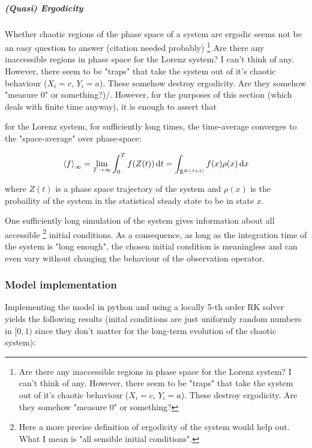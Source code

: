 \documentclass[11pt]{article}
\newcommand{\R}{{\mathbb{R}}}
\begin{document}
\subparagraph{(Quasi) Ergodicity}
\label{sec:org5576994}

Whether chaotic regions of the phase space of a system are ergodic seems not be an easy question
to answer (citation needed probably) \footnote{Are there any inaccessible regions in phase space
for the Lorenz system? I can't think of any. However, there seem to be "traps" that take the
system out of it's chaotic behaviour (\(X_i = c\), \(Y_i=a\)). These destroy ergodicity.
Are they somehow "measure 0" or something?} Are there any inaccessible regions in phase space
for the Lorenz system? I can't think of any. However, there seem to be "traps" that take the
system out of it's chaotic behaviour (\(X_i = c\), \(Y_i=a\)). These somehow destroy ergodicity.
Are they somehow "measure 0" or something?)/. However, for the purposes of this section (which deals with
finite time anyway), it is enough to assert that

for the Lorenz system, for sufficiently long times, the time-average converges to the
"space-average" over phase-space:

\begin{equation}
\label{eqn:lorenz_ergodicity}
   \expval{f}_{\infty} = \lim_{T \to \infty} \int_0^T f(Z(t)) \dd{t} = \int_{\R^{K(J+1)}} f(x) \rho(x) \dd{x}
\end{equation}

where \(Z(t)\) is a phase space trajectory of the system and \(\rho(x)\) is the probaility of the
system in the statistical steady state to be in state \(x\).

One sufficiently long simulation of the system gives information about all accessible \footnote{Here a more precise definition of ergodicity of the system would help out. What I mean
is "all sensible initial conditions".} initial conditions.
As a consequence, as long as the integration time of the system is "long enough", the chosen initial
condition is meaningless and can even vary without changing the behaviour of the observation operator.

\subsubsection{Model implementation}
\label{sec:org78be6d5}

Implementing the model in python and using a locally 5-th order RK solver yields the following
results (inital conditions are just uniformly random numbers in \([0,1)\) since they don't matter
for the long-term evolution of the chaotic system):
\end{document}
